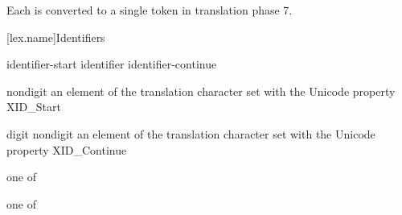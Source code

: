 Each  is converted to a single token
in translation phase 7.%
%

[lex.name]{Identifiers}

%
\begin{bnf}
\br
    identifier-start\br
    identifier identifier-continue
\end{bnf}

\begin{bnf}
\br
    nondigit\br
    \textnormal{an element of the translation character set with the Unicode property XID_Start}
\end{bnf}

\begin{bnf}
\br
    digit\br
    nondigit\br
    \textnormal{an element of the translation character set with the Unicode property XID_Continue}
\end{bnf}

\begin{bnf}
 \textnormal{one of}\br
    \br
    \br
    \br
\end{bnf}

\begin{bnf}
 \textnormal{one of}\br
\end{bnf}

